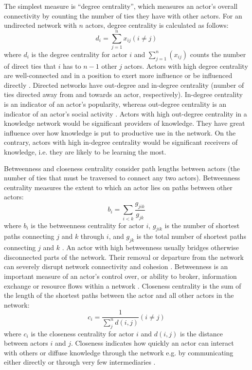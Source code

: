 The simplest measure is \enquote{degree centrality}, which measures an actor's overall connectivity by counting the number of ties they have with other actors. For an undirected network with \(n\) actors, degree centrality is calculated as follows: $$ d_i=\sum_{j=1}^{n}x_{ij}(i \neq j) $$ where $d_i$ is the degree centrality for actor $i$ and $\sum_{j=1}^{n}(x_{ij})$ counts the number of direct ties that $i$ has to $n-1$ other $j$ actors. Actors with high degree centrality are well-connected and in a position to exert more influence or be influenced directly \citep{borgatti2013analyzing}. Directed networks have out-degree and in-degree centrality (number of ties directed away from and towards an actor, respectively). In-degree centrality is an indicator of an actor's popularity, whereas out-degree centrality is an indicator of an actor's social activity \citep{robins2015doing}. Actors with high out-degree centrality in a knowledge network would be significant providers of knowledge. They have great influence over how knowledge is put to productive use in the network. On the contrary, actors with high in-degree centrality would be significant receivers of knowledge, i.e. they are likely to be learning the most. \medskip

Betweenness and closeness centrality consider path lengths between actors (the number of ties that must be traversed to connect any two actors). Betweenness centrality measures the extent to which an actor lies on paths between other actors: $$ b_i=\sum_{i < k}\frac{g_{jik}}{g_{jk}} $$ where $b_i$ is the betweenness centrality for actor $i$, $g_{jik}$ is the number of shortest paths connecting $j$ and $k$ through $i$, and $g_{jk}$ is the total number of shortest paths connecting $j$ and $k$ \citep{freeman1979centrality}. An actor with high betweenness usually bridges otherwise disconnected parts of the network. Their removal or departure from the network can severely disrupt network connectivity and cohesion \citep{borgatti2013analyzing}. Betweenness is an important measure of an actor's control over, or ability to broker, information exchange or resource flows within a network \citep{knoke2008social,everett2016bridging}.  Closeness centrality is the sum of the length of the shortest paths between the actor and all other actors in the network: $$c_i=\frac{1}{\sum_{j}^{n}d(i,j)}(i \neq j)$$ where $c_i$ is the closeness centrality for actor $i$ and $d(i,j)$ is the distance between actors $i$ and $j$. Closeness indicates how quickly an actor can interact with others or diffuse knowledge through the network e.g. by communicating either directly or through very few intermediaries \citep{bavelas1950communication,freeman1979centrality,knoke2008social}. \medskip

